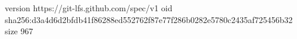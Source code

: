 version https://git-lfs.github.com/spec/v1
oid sha256:d3a4d6d2bfdb41f86288ed552762f87e77f286b0282e5780c2435af725456b32
size 967
